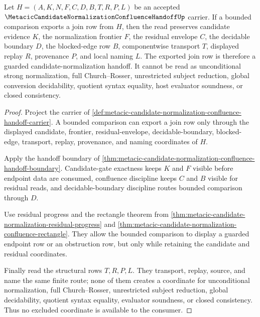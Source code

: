 \begin{theorem}
\label{thm:metacic-candidate-normalization-confluence-boundary}
Let $H=(A,K,N,F,C,D,B,T,R,P,L)$ be an accepted $\MetacicCandidateNormalizationConfluenceHandoffUp$ carrier. If a bounded comparison exports a join row from $H$, then the read preserves candidate evidence $K$, the normalization frontier $F$, the residual envelope $C$, the decidable boundary $D$, the blocked-edge row $B$, componentwise transport $T$, displayed replay $R$, provenance $P$, and local naming $L$. The exported join row is therefore a guarded candidate-normalization handoff. It cannot be read as unconditional strong normalization, full Church--Rosser, unrestricted subject reduction, global conversion decidability, quotient syntax equality, host evaluator soundness, or closed consistency.
\end{theorem}
\begin{proof}
Project the carrier of \autoref{def:metacic-candidate-normalization-confluence-handoff-carrier}. A bounded comparison can export a join row only through the displayed candidate, frontier, residual-envelope, decidable-boundary, blocked-edge, transport, replay, provenance, and naming coordinates of $H$.

Apply the handoff boundary of \autoref{thm:metacic-candidate-normalization-confluence-handoff-boundary}. Candidate-gate exactness keeps $K$ and $F$ visible before endpoint data are consumed, confluence discipline keeps $C$ and $B$ visible for residual reads, and decidable-boundary discipline routes bounded comparison through $D$.

Use residual progress and the rectangle theorem from \autoref{thm:metacic-candidate-normalization-residual-progress} and \autoref{thm:metacic-candidate-normalization-confluence-rectangle}. They allow the bounded comparison to display a guarded endpoint row or an obstruction row, but only while retaining the candidate and residual coordinates.

Finally read the structural rows $T,R,P,L$. They transport, replay, source, and name the same finite route; none of them creates a coordinate for unconditional normalization, full Church--Rosser, unrestricted subject reduction, global decidability, quotient syntax equality, evaluator soundness, or closed consistency. Thus no excluded coordinate is available to the consumer.
\end{proof}

